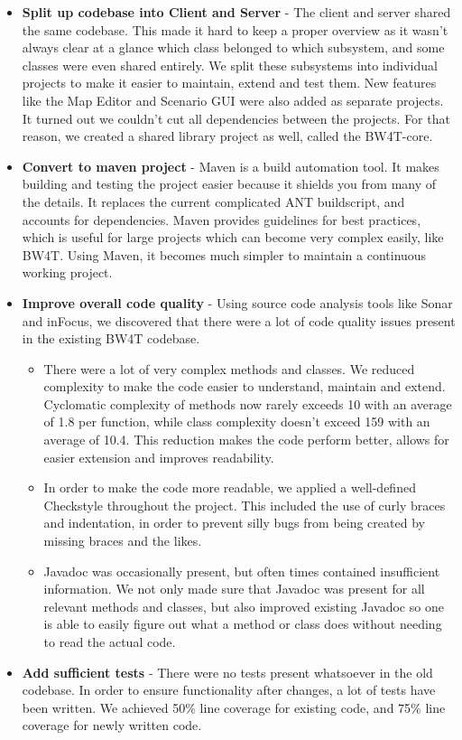 \begin{itemize}
\item
\textbf{Split up codebase into Client and Server} - The client and server shared the same codebase. This made it hard to keep a proper overview as it wasn't always clear at a glance which class belonged to which subsystem, and some classes were even shared entirely. We split these subsystems into individual projects to make it easier to maintain, extend and test them. New features like the Map Editor and Scenario GUI were also added as separate projects. It turned out we couldn't cut all dependencies between the projects. For that reason, we created a shared library project as well, called the BW4T-core. 
\item
\textbf{Convert to maven project} - Maven is a build automation tool. It makes building and testing the project easier because it shields you from many of the details. It replaces the current complicated ANT buildscript, and accounts for dependencies. Maven provides guidelines for best practices, which is useful for large projects which can become very complex easily, like BW4T. Using Maven, it becomes much simpler to maintain a continuous working project.
\item
\textbf{Improve overall code quality} - Using source code analysis tools like Sonar and inFocus, we discovered that there were a lot of code quality issues present in the existing BW4T codebase.

\begin{itemize}
\item
There were a lot of very complex methods and classes. We reduced complexity to make the code easier to understand, maintain and extend. Cyclomatic complexity of methods now rarely exceeds 10 with an average of 1.8 per function, while class complexity doesn't exceed 159 with an average of 10.4. This reduction makes the code perform better, allows for easier extension and improves readability. 
\item
In order to make the code more readable, we applied a well-defined Checkstyle throughout the project. This included the use of curly braces and indentation, in order to prevent silly bugs from being created by missing braces and the likes.
\item
Javadoc was occasionally present, but often times contained insufficient information. We not only made sure that Javadoc was present for all relevant methods and classes, but also improved existing Javadoc so one is able to easily figure out what a method or class does without needing to read the actual code.
\end{itemize}

\item
\textbf{Add sufficient tests} - There were no tests present whatsoever in the old codebase. In order to ensure functionality after changes, a lot of tests have been written. We achieved 50\% line coverage for existing code, and 75\% line coverage for newly written code. 
\end{itemize}
